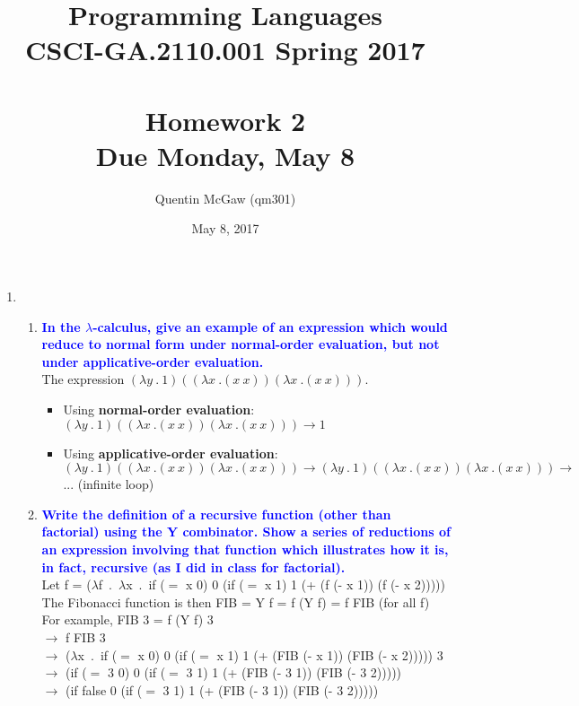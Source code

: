 \documentclass[10pt]{article}
\title{Programming Languages \\ CSCI-GA.2110.001 Spring 2017 \\\\ Homework 2 \\ Due Monday, May 8}
\author{Quentin McGaw (qm301)}
\date{May 8, 2017}
\begin{document}
\maketitle
\begin{enumerate}
    \item 
    \begin{enumerate}
        \item \textbf{\textcolor{blue}{In the $\lambda$-calculus, give an example of an expression which would reduce to normal form under normal-order evaluation, but not under applicative-order evaluation.}}
            \\ The expression $(\lambda y\ .\ 1)((\lambda x\ .(x\ x))(\lambda x\ .(x\ x)))$.
            \begin{itemize}
                \item Using \textbf{normal-order evaluation}:
                \\ $(\lambda y\ .\ 1)((\lambda x\ .(x\ x))(\lambda x\ .(x\ x))) \rightarrow 1$
                \item Using \textbf{applicative-order evaluation}:
                \\ $(\lambda y\ .\ 1)((\lambda x\ .(x\ x))(\lambda x\ .(x\ x))) \rightarrow (\lambda y\ .\ 1)((\lambda x\ .(x\ x))(\lambda x\ .(x\ x))) \rightarrow$ ... (infinite loop) 
            \end{itemize}
        \item \textbf{\textcolor{blue}{Write the definition of a recursive function (other than factorial) using the Y combinator. Show a series of reductions of an expression involving that function which illustrates how it is, in fact, recursive (as I did in class for factorial).}}
            \\ Let f = ($\lambda$f\ .\ $\lambda$x\ .\ if ($=$ x 0) 0 (if ($=$ x 1) 1 (+ (f (- x 1)) (f (- x 2)))))
            \\ The Fibonacci function is then FIB = Y f = f (Y f) = f FIB (for all f)
            \\ For example, FIB 3 = f (Y f) 3
            \\ $\rightarrow$ f FIB 3
            \\ $\rightarrow$ ($\lambda$x\ .\ if ($=$ x 0) 0 (if ($=$ x 1) 1 (+ (FIB (- x 1)) (FIB (- x 2))))) 3
            \\ $\rightarrow$ (if ($=$ 3 0) 0 (if ($=$ 3 1) 1 (+ (FIB (- 3 1)) (FIB (- 3 2)))))
            \\ $\rightarrow$ (if false 0 (if ($=$ 3 1) 1 (+ (FIB (- 3 1)) (FIB (- 3 2)))))

\end{enumerate}
\end{enumerate}
\end{document}
